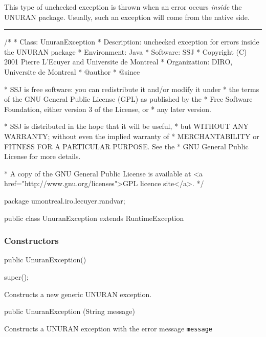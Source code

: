 
This type of unchecked exception is thrown when an error occurs
\emph{inside} the UNURAN package.  
Usually, such an exception will come from the native side.

\bigskip\hrule

\begin{code}
\begin{hide}
/*
 * Class:        UnuranException
 * Description:  unchecked exception for errors inside the UNURAN package
 * Environment:  Java
 * Software:     SSJ 
 * Copyright (C) 2001  Pierre L'Ecuyer and Universite de Montreal
 * Organization: DIRO, Universite de Montreal
 * @author       
 * @since

 * SSJ is free software: you can redistribute it and/or modify it under
 * the terms of the GNU General Public License (GPL) as published by the
 * Free Software Foundation, either version 3 of the License, or
 * any later version.

 * SSJ is distributed in the hope that it will be useful,
 * but WITHOUT ANY WARRANTY; without even the implied warranty of
 * MERCHANTABILITY or FITNESS FOR A PARTICULAR PURPOSE.  See the
 * GNU General Public License for more details.

 * A copy of the GNU General Public License is available at
   <a href="http://www.gnu.org/licenses">GPL licence site</a>.
 */
\end{hide}
package umontreal.iro.lecuyer.randvar;

public class UnuranException extends RuntimeException\begin{hide} {\end{hide}
\end{code}

\subsubsection* {Constructors}
\begin{code}
   public UnuranException()\begin{hide} {
      super();
   }\end{hide}
\end{code}
\begin{tabb}   Constructs a new generic UNURAN exception.
\end{tabb}
\begin{code}

   public UnuranException (String message)\begin{hide} {
      super (message);
   }
}\end{hide}
\end{code}
\begin{tabb}   Constructs a UNURAN exception with the error
   message \texttt{message}
\end{tabb}
\begin{htmlonly}
\end{htmlonly}
